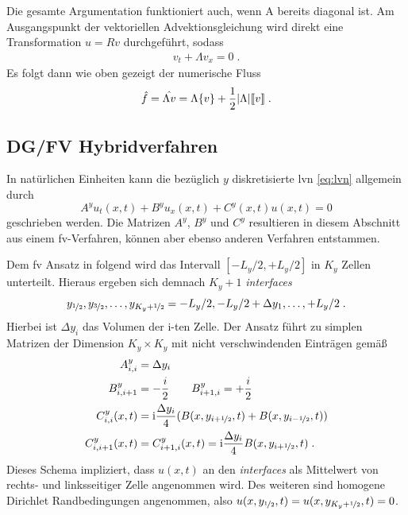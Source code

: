Die gesamte Argumentation funktioniert auch, wenn A bereits diagonal ist. Am Ausgangspunkt der vektoriellen Advektionsgleichung wird direkt eine Transformation $u=Rv$ durchgeführt, sodass
\begin{align}
  v_t + \Lambda v_x = 0 \; .
\end{align}
Es folgt dann wie oben gezeigt der numerische Fluss
\begin{align}
  \hat{f} = \hat{\Lambda v} = \Lambda\{ v \} + \frac{1}{2}|\Lambda|\llbracket v \rrbracket \; .
  \label{eq:FLUX}
\end{align}


\subsection{DG/FV Hybridverfahren}\label{sec:Hybridverfahren}
In natürlichen Einheiten kann die bezüglich $y$ diskretisierte \ac{lvn} \eqref{eq:lvn} allgemein durch
\begin{equation}
  {A}^y u_t(x,t) + {B}^y u_x(x,t) + {C}^y(x,t)u(x,t) = 0
  \label{eq:qschema}
\end{equation}
geschrieben werden. Die Matrizen  ${A}^y$, ${B}^y$ und ${C}^y$ resultieren in diesem Abschnitt aus einem \ac{fv}-Verfahren, können aber ebenso anderen Verfahren entstammen.

Dem \ac{fv} Ansatz in \cite{lukas1} folgend wird das Intervall ${[-L_y/2,+L_y/2]}$ in $K_y$ Zellen unterteilt. Hieraus ergeben sich demnach $K_y+1$ \emph{interfaces}
\begin{equation*}
  {y_{\nicefrac{1}{2}}, y_{\nicefrac{3}{2}}, \dots, y_{K_y + \nicefrac{1}{2}} = -L_y/2, -L_y/2+\Delta y_1,\dots,+L_y/2} \; .
\end{equation*}
Hierbei ist $\Delta y_i$ das Volumen der i-ten Zelle. Der Ansatz führt zu simplen Matrizen der Dimension ${K_y\times K_y}$ mit nicht verschwindenden Einträgen gemäß
\begin{equation}
  \begin{aligned}
  {A}^y_{i,i} &= \Delta y_i \\
  {B}^y_{i,i+1} &= -\frac{i}{2} \qquad
  {B}^y_{i+1, i} = +\frac{i}{2}  \\
  {C}^y_{i,i}(x,t) &= \mathrm{i} \frac{\Delta y_i}{4} (B(x, y_{i+\nicefrac{1}{2}},t) + B(x, y_{i-\nicefrac{1}{2}},t))  \\
  {C}^y_{i,i+1}(x,t) &= C^y_{i+1,i}(x,t) = \mathrm{i} \frac{\Delta y_i}{4} B(x, y_{i+\nicefrac{1}{2}},t)  \; .
  \end{aligned}
  \label{eq:ABC}
\end{equation}
Dieses Schema impliziert, dass $u(x,t)$ an den \emph{interfaces} als Mittelwert von rechts- und linksseitiger Zelle angenommen wird. Des weiteren sind  homogene Dirichlet Randbedingungen angenommen, also ${u(x,y_{\nicefrac{1}{2}}, t) = u(x,y_{K_y+\nicefrac{1}{2}}, t) = 0}$.

